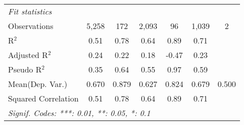 \begin{tabular}{lcccccc}
   \midrule
   \emph{Fit statistics}\\
   Observations                                               & 5,258         & 172           & 2,093        & 96      & 1,039         & 2\\  
   R$^2$                                                      & 0.51          & 0.78          & 0.64         & 0.89    & 0.71          & \\  
   Adjusted R$^2$                                             & 0.24          & 0.22          & 0.18         & -0.47   & 0.23          & \\  
   Pseudo R$^2$                                               & 0.35          & 0.64          & 0.55         & 0.97    & 0.59          & \\  
Mean(Dep. Var.) & 0.670 & 0.879 & 0.627 & 0.824 & 0.679 & 0.500 \\
   Squared Correlation                                        & 0.51          & 0.78          & 0.64         & 0.89    & 0.71          & \\  
   \midrule \midrule
   \multicolumn{7}{l}{\emph{Signif. Codes: ***: 0.01, **: 0.05, *: 0.1}}\\
\end{tabular}
\par\endgroup
